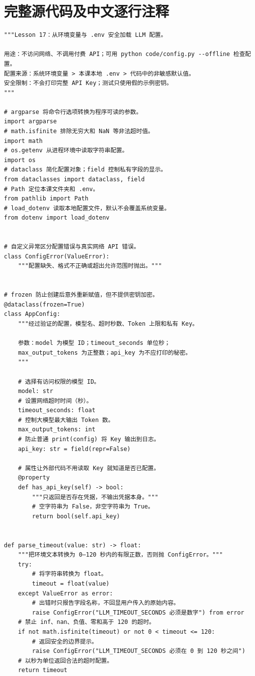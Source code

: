 \documentclass[UTF8,11pt,a4paper]{ctexart}
\begin{document}
\section{完整源代码及中文逐行注释}
\begin{Verbatim}[fontsize=\scriptsize,breaklines=true,breakanywhere=true]
"""Lesson 17：从环境变量与 .env 安全加载 LLM 配置。

用途：不访问网络、不调用付费 API；可用 python code/config.py --offline 检查配置。
配置来源：系统环境变量 > 本课本地 .env > 代码中的非敏感默认值。
安全限制：不会打印完整 API Key；测试只使用假的示例密钥。
"""

# argparse 将命令行选项转换为程序可读的参数。
import argparse
# math.isfinite 排除无穷大和 NaN 等非法超时值。
import math
# os.getenv 从进程环境中读取字符串配置。
import os
# dataclass 简化配置对象；field 控制私有字段的显示。
from dataclasses import dataclass, field
# Path 定位本课文件夹和 .env。
from pathlib import Path
# load_dotenv 读取本地配置文件，默认不会覆盖系统变量。
from dotenv import load_dotenv


# 自定义异常区分配置错误与真实网络 API 错误。
class ConfigError(ValueError):
    """配置缺失、格式不正确或超出允许范围时抛出。"""


# frozen 防止创建后意外重新赋值，但不提供密钥加密。
@dataclass(frozen=True)
class AppConfig:
    """经过验证的配置，模型名、超时秒数、Token 上限和私有 Key。

    参数：model 为模型 ID；timeout_seconds 单位秒；
    max_output_tokens 为正整数；api_key 为不应打印的秘密。
    """

    # 选择有访问权限的模型 ID。
    model: str
    # 设置网络超时时间（秒）。
    timeout_seconds: float
    # 控制大模型最大输出 Token 数。
    max_output_tokens: int
    # 防止普通 print(config) 将 Key 输出到日志。
    api_key: str = field(repr=False)

    # 属性让外部代码不用读取 Key 就知道是否已配置。
    @property
    def has_api_key(self) -> bool:
        """只返回是否存在凭据，不输出凭据本身。"""
        # 空字符串为 False，非空字符串为 True。
        return bool(self.api_key)


def parse_timeout(value: str) -> float:
    """把环境文本转换为 0–120 秒内的有限正数，否则抛 ConfigError。"""
    try:
        # 将字符串转换为 float。
        timeout = float(value)
    except ValueError as error:
        # 出错时只报告字段名称，不回显用户传入的原始内容。
        raise ConfigError("LLM_TIMEOUT_SECONDS 必须是数字") from error
    # 禁止 inf、nan、负值、零和高于 120 的超时。
    if not math.isfinite(timeout) or not 0 < timeout <= 120:
        # 返回安全的边界提示。
        raise ConfigError("LLM_TIMEOUT_SECONDS 必须在 0 到 120 秒之间")
    # 以秒为单位返回合法的超时配置。
    return timeout



\end{Verbatim}
\end{document}
